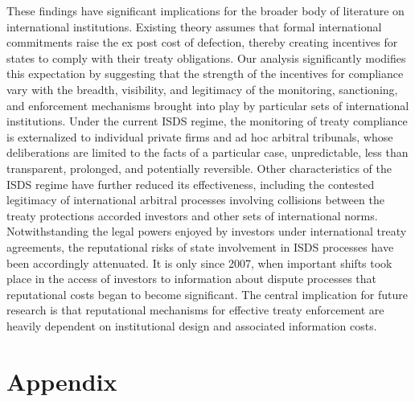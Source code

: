 \documentclass[12pt,onesided]{amsart}
\begin{document}
These findings have significant implications for the broader body of literature on international institutions. Existing theory assumes that formal international commitments raise the ex post cost of defection, thereby creating incentives for states to comply with their treaty obligations. Our analysis significantly modifies this expectation by suggesting that the strength of the incentives for compliance vary with the breadth, visibility, and legitimacy of the monitoring, sanctioning, and enforcement mechanisms brought into play by particular sets of international institutions. Under the current ISDS regime, the monitoring of treaty compliance is externalized to individual private firms and ad hoc arbitral tribunals, whose deliberations are limited to the facts of a particular case, unpredictable, less than transparent, prolonged, and potentially reversible. Other characteristics of the ISDS regime have further reduced its effectiveness, including the contested legitimacy of international arbitral processes involving collisions between the treaty protections accorded investors and other sets of international norms. Notwithstanding the legal powers enjoyed by investors under international treaty agreements, the reputational risks of state involvement in ISDS processes have been accordingly attenuated. It is only since 2007, when important shifts took place in the access of investors to information about dispute processes that reputational costs began to become significant. The central implication for future research is that reputational mechanisms for effective treaty enforcement are heavily dependent on institutional design and associated information costs. 

\newpage





\processdelayedfloats 

\newpage

\section*{Appendix}
\label{appendix}

\appendix
\setcounter{figure}{0} \renewcommand{\thefigure}{A.\arabic{figure}}
\setcounter{table}{0} \renewcommand{\thetable}{A.\arabic{table}}
\end{document}
